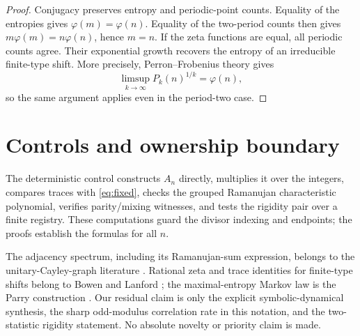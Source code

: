 \documentclass[11pt,a4paper]{amsart}
\theoremstyle{definition}
\theoremstyle{remark}
\begin{document}
\begin{proof}
Conjugacy preserves entropy and periodic-point counts.  Equality of the
entropies gives $\varphi(m)=\varphi(n)$.  Equality of the two-period counts
then gives $m\varphi(m)=n\varphi(n)$, hence $m=n$.  If the zeta functions are
equal, all periodic counts agree.  Their exponential growth recovers the
entropy of an irreducible finite-type shift.  More precisely,
Perron--Frobenius theory gives
\[
 \limsup_{k\to\infty}P_k(n)^{1/k}=\varphi(n),
\]
so the same argument applies even in the period-two case.
\end{proof}

\section{Controls and ownership boundary}

The deterministic control constructs $A_n$ directly, multiplies it over the
integers, compares traces with \eqref{eq:fixed}, checks the grouped
Ramanujan characteristic polynomial, verifies parity/mixing witnesses, and
tests the rigidity pair over a finite registry.  These computations guard
the divisor indexing and endpoints; the proofs establish the formulas for
all $n$.

The adjacency spectrum, including its Ramanujan-sum expression, belongs to
the unitary-Cayley-graph literature \cite{KlotzSander2007}.  Rational zeta and
trace identities for finite-type shifts belong to Bowen and Lanford
\cite{BowenLanford1970}; the maximal-entropy Markov law is the Parry
construction \cite{Parry1964}.  Our residual claim is only the explicit
symbolic-dynamical synthesis, the sharp odd-modulus correlation rate in this
notation, and the two-statistic rigidity statement.  No absolute novelty or
priority claim is made.



\end{document}
